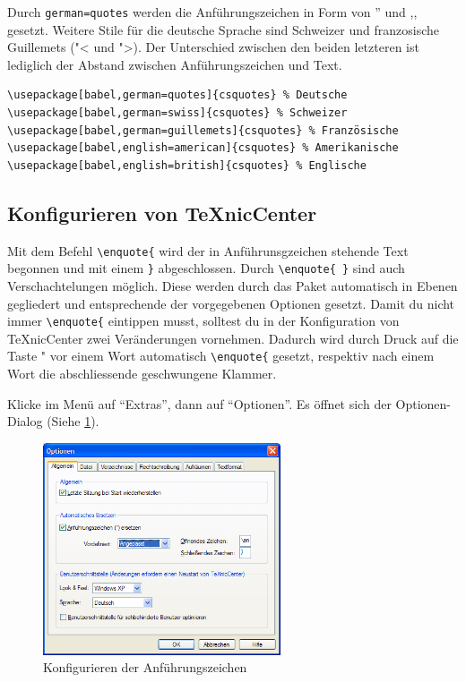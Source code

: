 Durch \verb|german=quotes| werden die Anführungszeichen in Form von '' und ,, gesetzt. Weitere Stile für die deutsche Sprache sind Schweizer und franzosische Guillemets ("< und ">). Der Unterschied zwischen den beiden letzteren ist lediglich der Abstand zwischen Anführungszeichen und Text.
\begin{lstlisting}[caption={Häufig verwendete \enquote{csquotes} Optionen.},label=lst:csquotesoptions,frame=tb]
\usepackage[babel,german=quotes]{csquotes} % Deutsche
\usepackage[babel,german=swiss]{csquotes} % Schweizer
\usepackage[babel,german=guillemets]{csquotes} % Französische
\usepackage[babel,english=american]{csquotes} % Amerikanische
\usepackage[babel,english=british]{csquotes} % Englische
\end{lstlisting}

\subsection{Konfigurieren von TeXnicCenter}

Mit dem Befehl \verb|\enquote{| wird der in Anführunsgzeichen stehende Text begonnen und mit einem \verb|}| abgeschlossen. Durch \verb|\enquote{ }| sind auch Verschachtelungen möglich. Diese werden durch das Paket automatisch in Ebenen gegliedert und entsprechende der vorgegebenen Optionen gesetzt. Damit du nicht immer \verb|\enquote{| eintippen musst, solltest du in der Konfiguration von TeXnicCenter zwei Veränderungen vornehmen. Dadurch wird durch Druck auf die Taste "{} vor einem Wort automatisch \verb|\enquote{| gesetzt, respektiv nach einem Wort die abschliessende geschwungene Klammer.

Klicke im Menü auf \enquote{Extras}, dann auf \enquote{Optionen}. Es öffnet sich der Optionen-Dialog (Siehe \cref{fig:konfiguration05}).

\begin{figure}
	\begin{center}
		\includegraphics[width=7cm]{images/konfiguration05.png}
		\caption{Konfigurieren der Anführungszeichen}
		\label{fig:konfiguration05}
	\end{center}
\end{figure}

